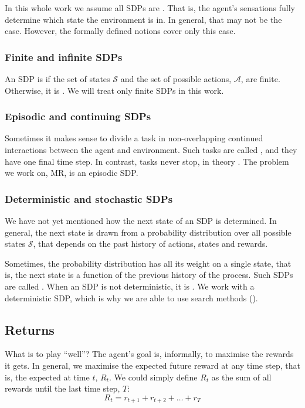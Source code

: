 In this whole work we assume all \aclp{SDP} are . That
is, the agent's sensations fully determine which state the environment is in. In
general, that may not be the case. However, the formally defined notions cover
only this case.

\subsubsection{Finite and infinite \acp{SDP}}
An \ac{SDP} is  if the set of states $\mathcal{S}$ and the
set of possible actions, $\mathcal{A}$, are finite. Otherwise, it is
. We will treat only finite \acp{SDP} in this work.

\subsubsection{Episodic and continuing \acp{SDP}}
Sometimes it makes sense to divide a task in non-overlapping continued
interactions between the agent and environment. Such tasks are called
, and they have one final time step. In contrast,
 tasks never stop, in theory
\citep[Section~3.3]{sutton1998introduction}. The problem we work on, \acl{MR},
is an episodic \ac{SDP}.

\subsubsection{Deterministic and stochastic \acp{SDP}}
We have not yet mentioned how the next state of an \ac{SDP} is determined. In
general, the next state is drawn from a probability distribution over all
possible states $\mathcal{S}$, that depends on the past history of actions,
states and rewards.

Sometimes, the probability distribution has all its weight on a single
state, that is, the next state is a function of the previous history of the
process. Such \acp{SDP} are called . When an \ac{SDP} is not
deterministic, it is . We work with a deterministic
\ac{SDP}, which is why we are able to use search methods ().

\subsection{Returns}
What is to play ``well''? The agent's goal is, informally, to maximise the rewards it
gets. In general, we maximise the expected future reward at any time step,
that is, the expected  at time $t$, $R_t$.
We could simply define $R_t$ as the sum of all rewards until the last time step, $T$:
\begin{equation}
  R_t = r_{t+1} + r_{t+2} + \dots + r_T
  \label{eq:undiscounted-reward}
\end{equation}

